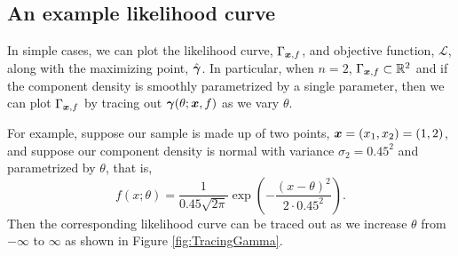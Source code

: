 	\subsection{An example likelihood curve}
		\label{sec:mixturelikelihoods:example}
		In simple cases, we can plot the likelihood curve, $\Gamma_{{\bm{{x}}}, f}$, and objective function, $\mathcal{L}$, along with the maximizing point, $\hat{{\bm{{\gamma}}}}$. In particular, when $n = 2$, $\Gamma_{{\bm{{x}}}, f} \subset \mathbb{R}^2$ and if the component density is smoothly parametrized by a single parameter, then we can plot $\Gamma_{{\bm{{x}}}, f}$ by tracing out ${\bm{{\gamma}}}(\theta; {\bm{{x}}}, f)$ as we vary $\theta$.

		For example, suppose our sample is made up of two points, ${\bm{{x}}} = (x_1, x_2) = (1,2)$, and suppose our component density is normal with variance $\sigma_2 = 0.45^2$ and parametrized by $\theta$, that is,
		\begin{equation}
		f(x;\theta) = \frac{1}{0.45 \sqrt{2 \pi}} \exp\left(-\frac{(x-\theta)^2}{2\cdot 0.45^2}\right).
		\label{eq:example component density for likelihood curve}
		\end{equation}
		Then the corresponding likelihood curve can be traced out as we increase $\theta$ from $-\infty$ to $\infty$ as shown in Figure \ref{fig:TracingGamma}. 

